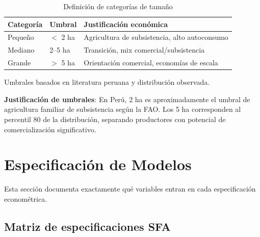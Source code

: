 \documentclass[11pt,a4paper]{article}
\begin{document}
\begin{table}[H]
\centering
\caption{Definición de categorías de tamaño}
\label{tab:size_categories}
\begin{threeparttable}
\small
\begin{tabular}{p{3cm}p{3cm}p{7cm}}
\toprule
\textbf{Categoría} & \textbf{Umbral} & \textbf{Justificación económica} \\
\midrule
Pequeño & $<$ 2 ha & Agricultura de subsistencia, alto autoconsumo \\
Mediano & 2--5 ha & Transición, mix comercial/subsistencia \\
Grande & $>$ 5 ha & Orientación comercial, economías de escala \\
\bottomrule
\end{tabular}
\begin{tablenotes}
\footnotesize
\item Umbrales basados en literatura peruana y distribución observada.
\end{tablenotes}
\end{threeparttable}
\end{table}

\textbf{Justificación de umbrales}: En Perú, 2 ha es aproximadamente el umbral de agricultura familiar de subsistencia según la FAO. Los 5 ha corresponden al percentil 80 de la distribución, separando productores con potencial de comercialización significativo.

\section{Especificación de Modelos}

Esta sección documenta exactamente qué variables entran en cada especificación econométrica.

\subsection{Matriz de especificaciones SFA}
\end{document}
